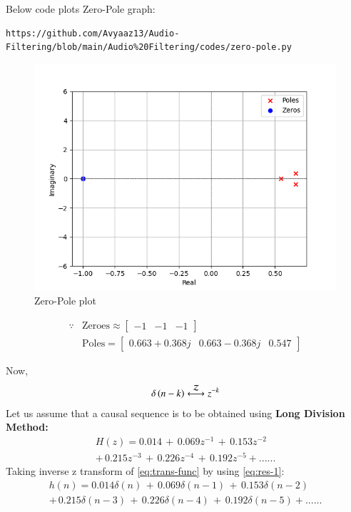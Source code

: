 \documentclass[journal,12pt,twocolumn]{IEEEtran}
\theoremstyle{remark}
\renewcommand\thesection{\arabic{section}}
\numberwithin{equation}{subsection}
\begin{document}
\begin{enumerate}[label=\thesection.\arabic*]
Below code plots  Zero-Pole graph:
\begin{lstlisting}
https://github.com/Avyaaz13/Audio-Filtering/blob/main/Audio%20Filtering/codes/zero-pole.py
\end{lstlisting}
\begin{figure}[!ht]
\centering
\includegraphics[width=\columnwidth]{figs/pole_zero.png}
\caption{Zero-Pole plot}
\label{fig: zero-pole}
\end{figure}

\begin{align}
\because&\text{Zeroes}\approx \begin{bmatrix}
-1 & -1 & -1
\end{bmatrix}\nonumber\\
&\text{Poles}= \begin{bmatrix}
0.663 + 0.368j & 0.663 - 0.368j & 0.547 
\end{bmatrix}\nonumber
\end{align}

Now,
\begin{align}
    \delta\brak{n-k} \system{Z} z^{-k}\label{eq:res-1}
\end{align}
Let us assume that a causal sequence is to be obtained using \textbf{Long Division Method:}
\begin{multline}
H(z) = 0.014 \,+\, 0.069z^{-1}\, +\, 0.153z^{-2} \\ + \,0.215z^{-3} \,+ \, 0.226z^{-4} \,+\, 0.192z^{-5} + ......
\end{multline}
Taking inverse z transform of \eqref{eq:trans-func} by using \eqref{eq:res-1}:
\begin{multline}
h(n) = 0.014\delta(n) \,+\, 0.069 \delta(n - 1)\, +\, 0.153\delta(n - 2) \\ + \,0.215\delta(n - 3) \,+ \, 0.226\delta(n - 4) \,+\, 0.192 \delta(n - 5) + ......
\end{multline}


\end{enumerate}
\end{document}
